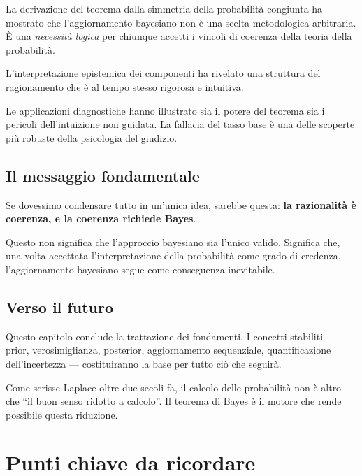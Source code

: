 \documentclass[
  italian,
  letterpaper,
  a4paper,
  11pt,
  open=any]{scrbook}
\theoremstyle{plain}
\theoremstyle{definition}
\theoremstyle{definition}
\theoremstyle{remark}
\begin{document}
La derivazione del teorema dalla simmetria della probabilità congiunta
ha mostrato che l'aggiornamento bayesiano non è una scelta metodologica
arbitraria. È una \emph{necessità logica} per chiunque accetti i vincoli
di coerenza della teoria della probabilità.

L'interpretazione epistemica dei componenti ha rivelato una struttura
del ragionamento che è al tempo stesso rigorosa e intuitiva.

Le applicazioni diagnostiche hanno illustrato sia il potere del teorema
sia i pericoli dell'intuizione non guidata. La fallacia del tasso base è
una delle scoperte più robuste della psicologia del giudizio.

\subsection{Il messaggio fondamentale}\label{il-messaggio-fondamentale}

Se dovessimo condensare tutto in un'unica idea, sarebbe questa:
\textbf{la razionalità è coerenza, e la coerenza richiede Bayes}.

Questo non significa che l'approccio bayesiano sia l'unico valido.
Significa che, una volta accettata l'interpretazione della probabilità
come grado di credenza, l'aggiornamento bayesiano segue come conseguenza
inevitabile.

\subsection{Verso il futuro}\label{verso-il-futuro}

Questo capitolo conclude la trattazione dei fondamenti. I concetti
stabiliti --- prior, verosimiglianza, posterior, aggiornamento
sequenziale, quantificazione dell'incertezza --- costituiranno la base
per tutto ciò che seguirà.

Come scrisse Laplace oltre due secoli fa, il calcolo delle probabilità
non è altro che ``il buon senso ridotto a calcolo''. Il teorema di Bayes
è il motore che rende possibile questa riduzione.

\section*{Punti chiave da ricordare}\label{punti-chiave-da-ricordare-4}

\end{document}
